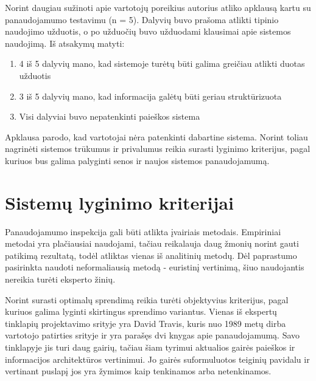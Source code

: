 \documentclass{VUMIFPSkursinis}
\begin{document}
Norint daugiau sužinoti apie vartotojų poreikius autorius atliko apklausą kartu su panaudojamumo testavimu (n = 5). Dalyvių buvo prašoma atlikti tipinio naudojimo užduotis, o po užduočių buvo užduodami klausimai apie sistemos naudojimą. Iš atsakymų matyti:
\begin{enumerate}
\item 4 iš 5 dalyvių mano, kad sistemoje turėtų būti galima greičiau atlikti duotas užduotis
\item 3 iš 5 dalyvių mano, kad informacija galėtų būti geriau struktūrizuota
\item Visi dalyviai buvo nepatenkinti paieškos sistema
\end{enumerate}

Apklausa parodo, kad vartotojai nėra patenkinti dabartine sistema. Norint toliau nagrinėti sistemos trūkumus ir privalumus reikia surasti lyginimo kriterijus, pagal kuriuos bus galima palyginti senos ir naujos sistemos panaudojamumą.



\section{Sistemų lyginimo kriterijai}
Panaudojamumo inspekcija gali būti atlikta įvairiais metodais. Empiriniai metodai yra plačiausiai naudojami\cite{NielsenUsabilityEn}, tačiau reikalauja daug žmonių norint gauti patikimą rezultatą, todėl atliktas vienas iš analitinių metodų. Dėl paprastumo pasirinkta naudoti neformaliausią metodą - euristinį vertinimą, šiuo naudojantis nereikia turėti eksperto žinių.

Norint surasti optimalų sprendimą reikia turėti objektyvius kriterijus, pagal kuriuos galima lyginti skirtingus sprendimo variantus. Vienas iš ekspertų tinklapių projektavimo srityje yra David Travis, kuris nuo 1989 metų dirba vartotojo patirties srityje ir yra parašęs dvi knygas apie panaudojamumą. Savo tinklapyje jis turi daug gairių, tačiau šiam tyrimui aktualios gairės paieškos ir informacijos architektūros vertinimui. Jo gairės suformuluotos teiginių pavidalu ir vertinant puslapį jos yra žymimos kaip tenkinamos arba netenkinamos\cite{SearchGuidelinesEn}\cite{NavigationAndIAGuidelinesEn}. 
\end{document}
